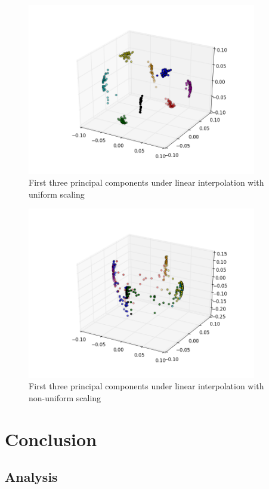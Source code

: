 \documentclass[12pt,journal,compsoc]{IEEEtran}
\begin{document}
\begin{figure}[tbp]
	\centering
	\includegraphics[trim={2cm 0 1cm 0},clip,width=10cm]{PrincipalComponentsDegenerateGood}
	\caption{First three principal components under linear interpolation with uniform scaling}
    \label{fig:principalcomponentsdegenerategood}
\end{figure}

\begin{figure}[tbp]
	\centering
	\includegraphics[trim={2cm 0 1cm 0},clip,width=10cm]{PrincipalComponentsDegenerateBad}
	\caption{First three principal components under linear interpolation with non-uniform scaling}
    \label{fig:principalcomponentsdegeneratebad}
\end{figure}


\section{Conclusion}

\subsection{Analysis}
\end{document}
